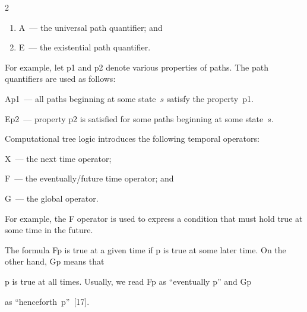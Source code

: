 \begin{multicols}{2}
\begin{enumerate}[(1)]
 \item A~--- the universal path quantifier; and


\item  E~--- the existential path quantifier.


\end{enumerate}














   For example, let p1 and p2 denote various properties of paths. The path quantifiers are used as follows:





Ap1~--- all paths beginning at some state~$s$ satisfy the property~p1.





Ep2~--- property p2 is satisfied for some paths be\-ginning at some state~$s$.





   Computational tree logic  introduces the following   temporal operators:





 X~--- the next time operator;





 F~--- the eventually/future time operator; and





 G~--- the global operator.





   For example, the F operator is used to express a condition that must hold true at some time in the future.


The formula Fp is true at a given time if p is true at some later time. On the other hand, Gp means that


p is true at all times. Usually, we read Fp as ``eventually p'' and Gp


as ``henceforth~p''~[17].












\end{multicols}
